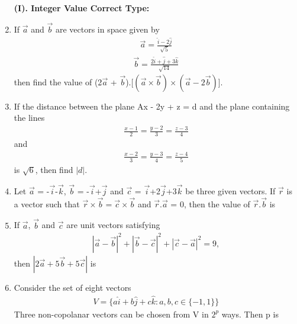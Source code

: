 \begin{enumerate}[label=\arabic*.,ref=\thesubsection.\theenumi]
\textbf{(I). Integer Value Correct Type:}

\item If $\overrightarrow{a}$ and $\overrightarrow{b}$ are vectors in space given by 
\begin{align*}
\overrightarrow{a} = \frac{\hat{i} - 2\hat{j}}{\sqrt{5}}
\end{align*}
\begin{align*}
\overrightarrow{b} = \frac{2\hat{i} + \hat{j} + 3\hat{k}}{\sqrt{14}}
\end{align*}
then find the value of (2$\overrightarrow{a}$ + $\overrightarrow{b}$).[$(\overrightarrow{a} \times \overrightarrow{b}) \times (\overrightarrow{a} - 2\overrightarrow{b})$].

\item If the distance between the plane Ax - 2y + z = d and the plane containing the lines
\begin{align*}
\frac{x-1}{2} = \frac{y-2}{3} = \frac{z-3}{4}
\end{align*}
and
\begin{align*}
\frac{x-2}{3} = \frac{y-3}{4} = \frac{z-4}{5}
\end{align*}
is $\sqrt{6}$, then find $|d|$.

\item Let $\overrightarrow{a}$ = -$\overrightarrow{i}$-$\overrightarrow{k}$, $\overrightarrow{b}$ = -$\overrightarrow{i}$+$\overrightarrow{j}$ and $\overrightarrow{c}$ = $\overrightarrow{i}$+2$\overrightarrow{j}$+3$\overrightarrow{k}$ be three given vectors. If $\overrightarrow{r}$ is a vector such that $\overrightarrow{r} \times \overrightarrow{b} = \overrightarrow{c} \times \overrightarrow{b}$ and $\overrightarrow{r}.\overrightarrow{a}$ = 0, then the value of $\overrightarrow{r}.\overrightarrow{b}$ is

\item If $\overrightarrow{a}$, $\overrightarrow{b}$ and $\overrightarrow{c}$ are unit vectors satisfying
\begin{align*}
|\overrightarrow{a}-\overrightarrow{b}|^{2} + |\overrightarrow{b}-\overrightarrow{c}|^{2} + |\overrightarrow{c}-\overrightarrow{a}|^{2} = 9,
\end{align*}
then $|2\overrightarrow{a} + 5\overrightarrow{b} + 5\overrightarrow{c}|$ is

\item Consider the set of eight vectors
\begin{align*}
V = \{a\hat{i} + b\hat{j} + c\hat{k}:a, b, c \in \{-1, 1\}\}
\end{align*}
Three non-copolanar vectors can be chosen from V in $2^{p}$ ways. Then p is 


\end{enumerate}
